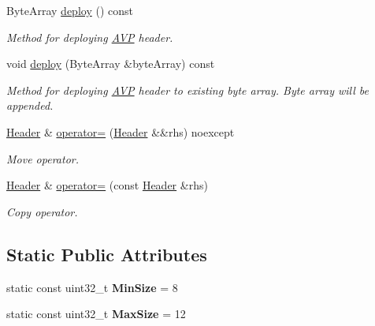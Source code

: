 \begin{DoxyCompactItemize}
Byte\+Array \hyperlink{classDiameter_1_1AVP_1_1Header_adb165b56a7160803480621b3789c972a}{deploy} () const
\begin{DoxyCompactList}\small\item\em Method for deploying \hyperlink{classDiameter_1_1AVP}{A\+VP} header. \end{DoxyCompactList}\item 
void \hyperlink{classDiameter_1_1AVP_1_1Header_ac56e1a44d35cb41d834581834cf17c25}{deploy} (Byte\+Array \&byte\+Array) const
\begin{DoxyCompactList}\small\item\em Method for deploying \hyperlink{classDiameter_1_1AVP}{A\+VP} header to existing byte array. Byte array will be appended. \end{DoxyCompactList}\item 
\hyperlink{classDiameter_1_1AVP_1_1Header}{Header} \& \hyperlink{classDiameter_1_1AVP_1_1Header_a3798fa2ecf6fb48e3d54af4fb874b12c}{operator=} (\hyperlink{classDiameter_1_1AVP_1_1Header}{Header} \&\&rhs) noexcept
\begin{DoxyCompactList}\small\item\em Move operator. \end{DoxyCompactList}\item 
\hyperlink{classDiameter_1_1AVP_1_1Header}{Header} \& \hyperlink{classDiameter_1_1AVP_1_1Header_ab458d5befcc1e997e0cc6dc3ef7ba41c}{operator=} (const \hyperlink{classDiameter_1_1AVP_1_1Header}{Header} \&rhs)
\begin{DoxyCompactList}\small\item\em Copy operator. \end{DoxyCompactList}\end{DoxyCompactItemize}
\subsection*{Static Public Attributes}
\begin{DoxyCompactItemize}
\item 
\mbox{\label{classDiameter_1_1AVP_1_1Header_ae29333d68885ba5197ce774a5766f66c}} 
static const uint32\+\_\+t {\bfseries Min\+Size} = 8
\item 
\mbox{\label{classDiameter_1_1AVP_1_1Header_a63cf83d400ab8509f274438339afcf36}} 
static const uint32\+\_\+t {\bfseries Max\+Size} = 12
\end{DoxyCompactItemize}


